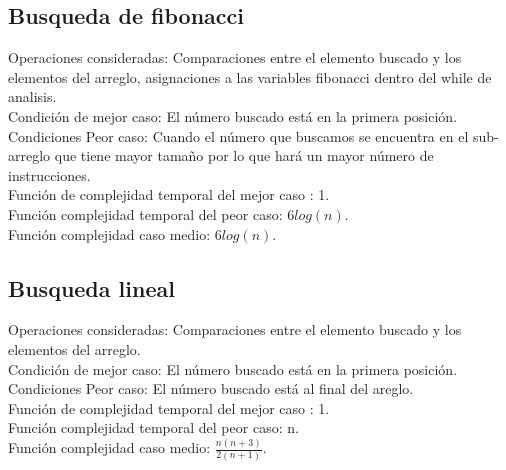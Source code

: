 \documentclass[12pt]{report}
\begin{document}
\subsection*{Busqueda de fibonacci}
Operaciones consideradas: Comparaciones entre el elemento buscado y los elementos del arreglo, asignaciones a las variables fibonacci dentro del while de analisis.\\
Condición de mejor caso: El número buscado está en la primera posición. \\
Condiciones Peor caso: Cuando el número que buscamos se encuentra en el sub-arreglo que tiene mayor tamaño por lo que hará un mayor número de instrucciones. \\
Función de complejidad temporal del mejor caso : 1.\\
Función complejidad temporal del peor caso: $6log(n)$. \\
Función complejidad caso medio: $6log(n)$.\\
\subsection*{Busqueda lineal}
Operaciones consideradas: Comparaciones entre el elemento buscado y los elementos del arreglo.\\
Condición de mejor caso: El número buscado está en la primera posición. \\
Condiciones Peor caso: El número buscado está al final del areglo. \\
Función de complejidad temporal del mejor caso : 1. \\
Función complejidad temporal del peor caso: n. \\
Función complejidad caso medio: $\frac{n(n+3)}{2(n+1)}$.\\
\end{document}
